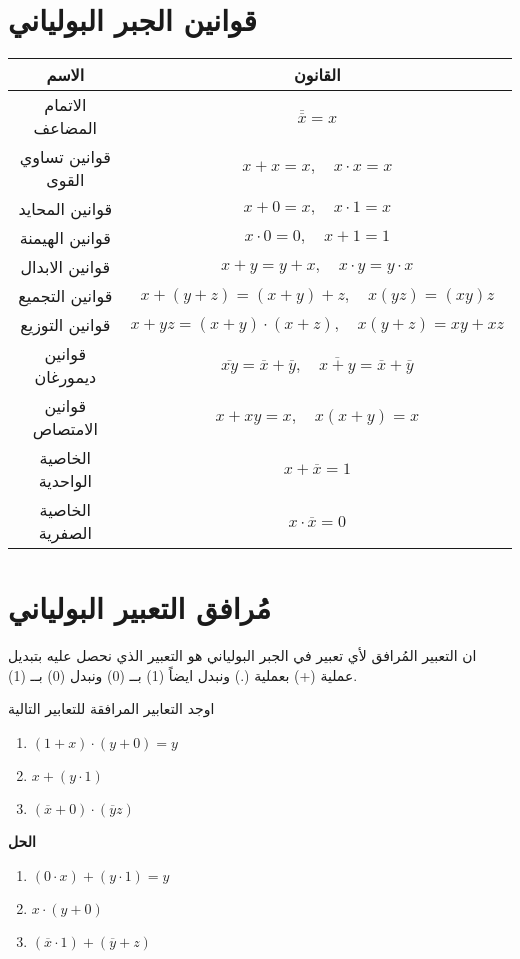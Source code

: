 \section{قوانين الجبر البولياني}

\begin{table}[H]
	\centering
	\renewcommand{\arraystretch}{1.7}
	\begin{tabular}{|c|c|}
		\hline
		\textbf{الاسم} & \textbf{القانون}\\
		\hline
		الاتمام المضاعف & $\overline{\overline{x}} = x$\\
				\hline
		قوانين تساوي القوى & $x+x =x, \quad x\cdot x=x$\\
				\hline
		قوانين المحايد & $x+0=x, \quad x\cdot1=x$\\
				\hline
		قوانين الهيمنة & $x\cdot 0 =0,\quad x+1 =1 $\\
				\hline
		قوانين الابدال & $x+y = y + x, \quad x\cdot y = y\cdot x$\\
				\hline
		قوانين التجميع & $x+(y+z) = (x+y)+z, \quad x(yz)=(xy)z$\\
				\hline
		قوانين التوزيع & $x+yz = (x+y)\cdot(x+z), \quad x(y+z)=xy+xz$\\
				\hline
		قوانين ديمورغان & $\overline{xy} = \overline{x}+\overline{y}, \quad \overline{x+y}= \overline{x}+\overline{y}$\\
				\hline
		قوانين الامتصاص & $x+xy=x, \quad x(x+y)=x$\\
				\hline
		الخاصية الواحدية & $x+\overline{x}=1$ \\
				\hline
		الخاصية الصفرية & $x\cdot \overline{x} = 0$\\
		\hline
	\end{tabular}
\end{table}

\section{مُرافق التعبير البولياني}
ان التعبير المُرافق لأي تعبير في الجبر البولياني هو التعبير الذي نحصل عليه بتبديل عملية (+) بعملية (.) ونبدل ايضاً (1) بــ (0) ونبدل (0) بــ (1).

\begin{example}
	اوجد التعابير المرافقة للتعابير التالية 
	\begin{enumerate}
		\item $(1+x) \cdot (y+0) = y$
		\item $x+(y\cdot 1)$
		\item $(\overline{x} + 0) \cdot(\overline{y}z)$
	\end{enumerate}
\end{example} 
\noindent
\textbf{الحل}
\begin{enumerate}
	\item $(0\cdot x) + (y\cdot 1) = y$
	\item $x\cdot (y+0)$
	\item $(\overline{x} \cdot 1) + ( \overline{y} + z)$
\end{enumerate}

